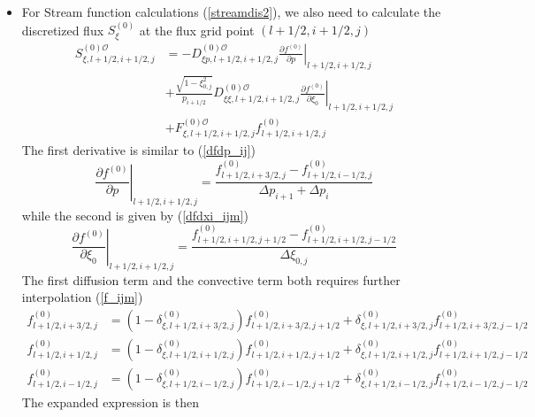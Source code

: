\begin{itemize}
\item  For Stream function calculations (\ref{streamdis2}), we also need to
calculate the discretized flux $S_{\xi}^{(0)}$ at the flux grid point $\left(
l+1/2,i+1/2,j\right)  $%
\begin{align}
S_{\xi,l+1/2,i+1/2,j}^{\left(  0\right)  \mathcal{O}} &  =-D_{\xi
p,l+1/2,i+1/2,j}^{(0)\mathcal{O}}\left.  \frac{\partial f^{(0)}}{\partial
p}\right|  _{l+1/2,i+1/2,j}\\
&  +\frac{\sqrt{1-\xi_{0,j}^{2}}}{p_{i+1/2}}D_{\xi\xi,l+1/2,i+1/2,j}%
^{(0)\mathcal{O}}\left.  \frac{\partial f^{(0)}}{\partial\xi_{0}}\right|
_{l+1/2,i+1/2,j}\nonumber\\
&  +F_{\xi,l+1/2,i+1/2,j}^{(0)\mathcal{O}}f_{l+1/2,i+1/2,j}^{(0)}\nonumber
\end{align}
The first derivative is similar to (\ref{dfdp_ij})
\begin{equation}
\left.  \frac{\partial f^{\left(  0\right)  }}{\partial p}\right|
_{l+1/2,i+1/2,j}=\frac{f_{l+1/2,i+3/2,j}^{\left(  0\right)  }%
-f_{l+1/2,i-1/2,j}^{\left(  0\right)  }}{\Delta p_{i+1}+\Delta p_{i}}%
\end{equation}
while the second is given by (\ref{dfdxi_ijm})
\begin{equation}
\left.  \frac{\partial f^{(0)}}{\partial\xi_{0}}\right|  _{l+1/2,i+1/2,j}%
=\frac{f_{l+1/2,i+1/2,j+1/2}^{\left(  0\right)  }-f_{l+1/2,i+1/2,j-1/2}%
^{\left(  0\right)  }}{\Delta\xi_{0,j}}%
\end{equation}
The first diffusion term and the convective term both requires further
interpolation (\ref{f_ijm})
\begin{align}
f_{l+1/2,i+3/2,j}^{\left(  0\right)  }  & =\left(  1-\delta_{\xi
,l+1/2,i+3/2,j}^{\left(  0\right)  }\right)  f_{l+1/2,i+3/2,j+1/2}^{\left(
0\right)  }+\delta_{\xi,l+1/2,i+3/2,j}^{\left(  0\right)  }%
f_{l+1/2,i+3/2,j-1/2}^{\left(  0\right)  }\\
f_{l+1/2,i+1/2,j}^{\left(  0\right)  }  & =\left(  1-\delta_{\xi
,l+1/2,i+1/2,j}^{\left(  0\right)  }\right)  f_{l+1/2,i+1/2,j+1/2}^{\left(
0\right)  }+\delta_{\xi,l+1/2,i+1/2,j}^{\left(  0\right)  }%
f_{l+1/2,i+1/2,j-1/2}^{\left(  0\right)  }\\
f_{l+1/2,i-1/2,j}^{\left(  0\right)  }  & =\left(  1-\delta_{\xi
,l+1/2,i-1/2,j}^{\left(  0\right)  }\right)  f_{l+1/2,i-1/2,j+1/2}^{\left(
0\right)  }+\delta_{\xi,l+1/2,i-1/2,j}^{\left(  0\right)  }%
f_{l+1/2,i-1/2,j-1/2}^{\left(  0\right)  }%
\end{align}
The expanded expression is then
\begin{align}

\end{align}
\end{itemize}
